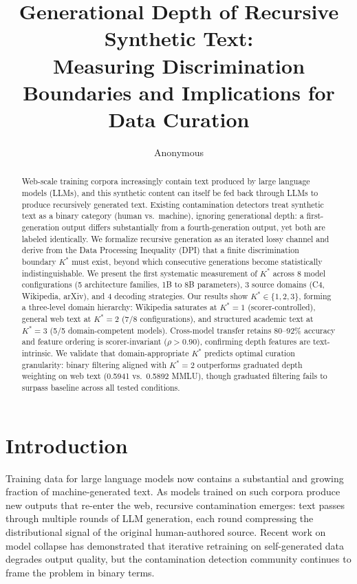 \documentclass[11pt,a4paper]{article}
\title{Generational Depth of Recursive Synthetic Text:\\Measuring Discrimination Boundaries and Implications for Data Curation}
\author{Anonymous}
\date{}
\begin{document}
\maketitle

\begin{abstract}
Web-scale training corpora increasingly contain text produced by large language models (LLMs), and this synthetic content can itself be fed back through LLMs to produce recursively generated text. Existing contamination detectors treat synthetic text as a binary category (human vs.\ machine), ignoring generational depth: a first-generation output differs substantially from a fourth-generation output, yet both are labeled identically. We formalize recursive generation as an iterated lossy channel and derive from the Data Processing Inequality (DPI) that a finite discrimination boundary $K^*$ must exist, beyond which consecutive generations become statistically indistinguishable. We present the first systematic measurement of $K^*$ across 8 model configurations (5 architecture families, 1B to 8B parameters), 3 source domains (C4, Wikipedia, arXiv), and 4 decoding strategies. Our results show $K^* \in \{1, 2, 3\}$, forming a three-level domain hierarchy: Wikipedia saturates at $K^*\!=\!1$ (scorer-controlled), general web text at $K^*\!=\!2$ (7/8 configurations), and structured academic text at $K^*\!=\!3$ (5/5 domain-competent models). Cross-model transfer retains 80--92\% accuracy and feature ordering is scorer-invariant ($\rho > 0.90$), confirming depth features are text-intrinsic. We validate that domain-appropriate $K^*$ predicts optimal curation granularity: binary filtering aligned with $K^*\!=\!2$ outperforms graduated depth weighting on web text (0.5941 vs.\ 0.5892 MMLU), though graduated filtering fails to surpass baseline across all tested conditions.
\end{abstract}

\section{Introduction}

Training data for large language models now contains a substantial and growing fraction of machine-generated text. As models trained on such corpora produce new outputs that re-enter the web, recursive contamination emerges: text passes through multiple rounds of LLM generation, each round compressing the distributional signal of the original human-authored source. Recent work on model collapse has demonstrated that iterative retraining on self-generated data degrades output quality, but the contamination detection community continues to frame the problem in binary terms.
\end{document}
